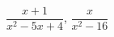 \hspace*{2mm}\begin{minipage}[t]{\dimexpr\linewidth-2mm\relax}\vspace{0pt}
$\dfrac{x+1}{x^2-5x+4}$, $\dfrac{x}{x^2-16}$\end{minipage}
